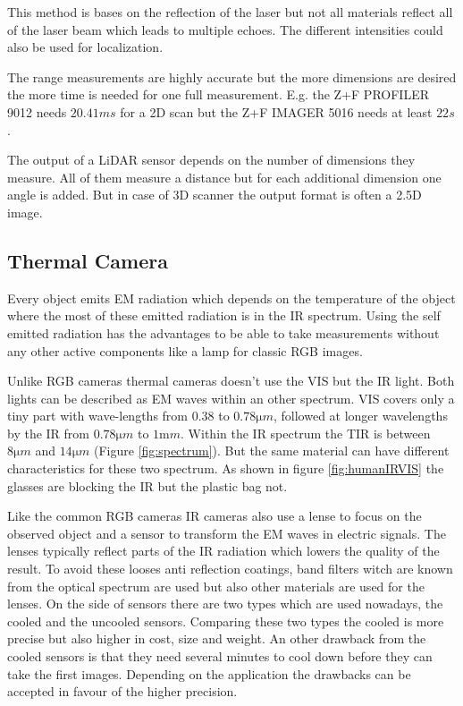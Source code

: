 This method is bases on the reflection of the laser but not all materials reflect all of the laser beam which leads to multiple echoes.
The different intensities could also be used for localization\cite{Barsen2018}.

The range measurements are highly accurate but the more dimensions are desired the more time is needed for one full measurement.
E.g. the Z+F PROFILER\circledR{} 9012\cite{z+fLaserProfiler} needs $20.41\si{ms}$ for a 2D scan but the Z+F IMAGER\circledR{} 5016 needs at least $22\si{s}$.

The output of a \ac{LiDAR} sensor depends on the number of dimensions they measure.
All of them measure a distance but for each additional dimension one angle is added.
But in case of 3D scanner the output format is often a 2.5D image.

\subsection{Thermal Camera}\label{ssec:thermalCamera}

Every object emits \ac{EM} radiation which depends on the temperature of the object where the most of these emitted radiation is in the \ac{IR} spectrum.
Using the self emitted radiation has the advantages to be able to take measurements without any other active components like a lamp for classic RGB images.

Unlike RGB cameras thermal cameras doesn't use the \ac{VIS} but the \ac{IR} light.
Both lights can be described as \ac{EM} waves within an other spectrum.
\ac{VIS} covers only a tiny part with wave-lengths from $0.38$ to $0.78\si{\micro m}$, followed at longer wavelengths by the \ac{IR} from $0.78\si{\micro m}$ to $1\si{\milli m}$.
Within the \ac{IR} spectrum the \ac{TIR} is between $8\si{\micro m}$ and $14\si{\micro m}$\cite{Vollmer2017} (Figure \ref{fig:spectrum}).
But the same material can have different characteristics for these two spectrum.
As shown in figure \ref{fig:humanIRVIS} the glasses are blocking the \ac{IR} but the plastic bag not.

Like the common RGB cameras \ac{IR} cameras also use a lense to focus on the observed object and a sensor to transform the \ac{EM} waves in electric signals.
The lenses typically reflect parts of the \ac{IR} radiation which lowers the quality of the result.
To avoid these looses anti reflection coatings, band filters witch are known from the optical spectrum are used\cite{Vollmer2017} but also other materials are used for the lenses.
On the side of sensors there are two types which are used nowadays, the cooled and the uncooled sensors.
Comparing these two types the cooled is more precise but also higher in cost, size and weight.
An other drawback from the cooled sensors is that they need several minutes to cool down before they can take the first images.
Depending on the application the drawbacks can be accepted in favour of the higher precision.


